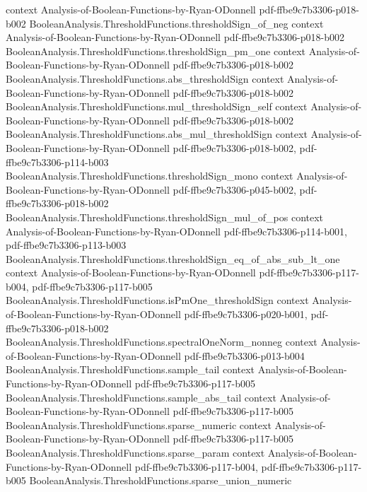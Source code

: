 \begin{theorem}
  {context}
  {Analysis-of-Boolean-Functions-by-Ryan-ODonnell}
  {pdf-ffbe9c7b3306-p018-b002}
\proofstep
  {BooleanAnalysis.ThresholdFunctions.thresholdSign_of_neg}
  {context}
  {Analysis-of-Boolean-Functions-by-Ryan-ODonnell}
  {pdf-ffbe9c7b3306-p018-b002}
\proofstep
  {BooleanAnalysis.ThresholdFunctions.thresholdSign_pm_one}
  {context}
  {Analysis-of-Boolean-Functions-by-Ryan-ODonnell}
  {pdf-ffbe9c7b3306-p018-b002}
\proofstep
  {BooleanAnalysis.ThresholdFunctions.abs_thresholdSign}
  {context}
  {Analysis-of-Boolean-Functions-by-Ryan-ODonnell}
  {pdf-ffbe9c7b3306-p018-b002}
\proofstep
  {BooleanAnalysis.ThresholdFunctions.mul_thresholdSign_self}
  {context}
  {Analysis-of-Boolean-Functions-by-Ryan-ODonnell}
  {pdf-ffbe9c7b3306-p018-b002}
\proofstep
  {BooleanAnalysis.ThresholdFunctions.abs_mul_thresholdSign}
  {context}
  {Analysis-of-Boolean-Functions-by-Ryan-ODonnell}
  {pdf-ffbe9c7b3306-p018-b002,
    pdf-ffbe9c7b3306-p114-b003}
\proofstep
  {BooleanAnalysis.ThresholdFunctions.thresholdSign_mono}
  {context}
  {Analysis-of-Boolean-Functions-by-Ryan-ODonnell}
  {pdf-ffbe9c7b3306-p045-b002,
    pdf-ffbe9c7b3306-p018-b002}
\proofstep
  {BooleanAnalysis.ThresholdFunctions.thresholdSign_mul_of_pos}
  {context}
  {Analysis-of-Boolean-Functions-by-Ryan-ODonnell}
  {pdf-ffbe9c7b3306-p114-b001,
    pdf-ffbe9c7b3306-p113-b003}
\proofstep
  {BooleanAnalysis.ThresholdFunctions.thresholdSign_eq_of_abs_sub_lt_one}
  {context}
  {Analysis-of-Boolean-Functions-by-Ryan-ODonnell}
  {pdf-ffbe9c7b3306-p117-b004,
    pdf-ffbe9c7b3306-p117-b005}
\proofstep
  {BooleanAnalysis.ThresholdFunctions.isPmOne_thresholdSign}
  {context}
  {Analysis-of-Boolean-Functions-by-Ryan-ODonnell}
  {pdf-ffbe9c7b3306-p020-b001,
    pdf-ffbe9c7b3306-p018-b002}
\proofstep
  {BooleanAnalysis.ThresholdFunctions.spectralOneNorm_nonneg}
  {context}
  {Analysis-of-Boolean-Functions-by-Ryan-ODonnell}
  {pdf-ffbe9c7b3306-p013-b004}
\proofstep
  {BooleanAnalysis.ThresholdFunctions.sample_tail}
  {context}
  {Analysis-of-Boolean-Functions-by-Ryan-ODonnell}
  {pdf-ffbe9c7b3306-p117-b005}
\proofstep
  {BooleanAnalysis.ThresholdFunctions.sample_abs_tail}
  {context}
  {Analysis-of-Boolean-Functions-by-Ryan-ODonnell}
  {pdf-ffbe9c7b3306-p117-b005}
\proofstep
  {BooleanAnalysis.ThresholdFunctions.sparse_numeric}
  {context}
  {Analysis-of-Boolean-Functions-by-Ryan-ODonnell}
  {pdf-ffbe9c7b3306-p117-b005}
\proofstep
  {BooleanAnalysis.ThresholdFunctions.sparse_param}
  {context}
  {Analysis-of-Boolean-Functions-by-Ryan-ODonnell}
  {pdf-ffbe9c7b3306-p117-b004,
    pdf-ffbe9c7b3306-p117-b005}
\proofstep
  {BooleanAnalysis.ThresholdFunctions.sparse_union_numeric}

\end{theorem}
